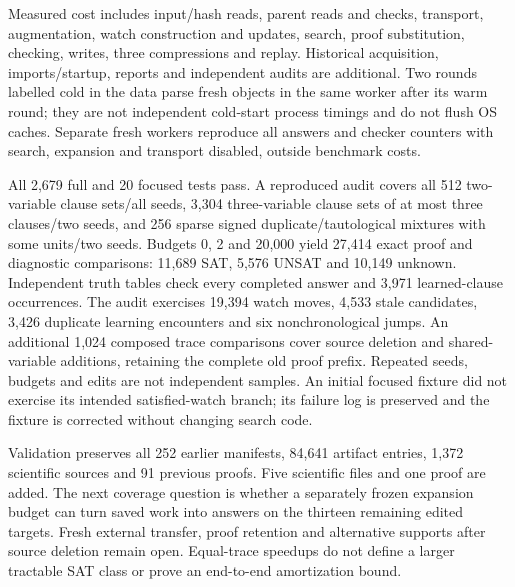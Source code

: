 Measured cost includes input/hash reads, parent reads and checks, transport,
augmentation, watch construction and updates, search, proof substitution,
checking, writes, three compressions and replay.  Historical acquisition,
imports/startup, reports and independent audits are additional.  Two rounds
labelled cold in the data parse fresh objects in the same worker after its warm
round; they are not independent cold-start process timings and do not flush OS
caches.  Separate fresh workers reproduce all answers and checker counters with
search, expansion and transport disabled, outside benchmark costs.

All 2,679 full and 20 focused tests pass.  A reproduced audit covers all 512
two-variable clause sets/all seeds, 3,304 three-variable clause sets of at most
three clauses/two seeds, and 256 sparse signed duplicate/tautological mixtures
with some units/two seeds.  Budgets 0, 2 and 20,000 yield 27,414 exact proof and
diagnostic comparisons: 11,689 SAT, 5,576 UNSAT and 10,149 unknown.  Independent
truth tables check every completed answer and 3,971 learned-clause occurrences.
The audit exercises 19,394 watch moves, 4,533 stale candidates, 3,426 duplicate
learning encounters and six nonchronological jumps.  An additional 1,024 composed
trace comparisons cover source deletion and shared-variable additions, retaining
the complete old proof prefix.  Repeated seeds, budgets and edits are not
independent samples.  An initial focused fixture did not exercise its intended
satisfied-watch branch; its failure log is preserved and the fixture is corrected
without changing search code.

Validation preserves all 252 earlier manifests, 84,641 artifact entries,
1,372 scientific sources and 91 previous proofs.  Five scientific files and one
proof are added.  The next coverage question is whether a separately frozen
expansion budget can turn saved work into answers on the thirteen remaining
edited targets.  Fresh external transfer, proof retention and alternative
supports after source deletion remain open.  Equal-trace speedups do not define
a larger tractable SAT class or prove an end-to-end amortization bound.
